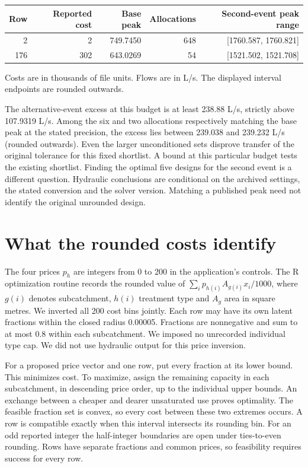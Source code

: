 \documentclass[11pt]{article}
\begin{document}
\begin{center}
\begin{tabular}{rrrrr}\toprule
Row & Reported cost & Base peak & Allocations & Second-event peak range\\\midrule
2 & 2 & 749.7450 & 648 & [1760.587, 1760.821]\\
176 & 302 & 643.0269 & 54 & [1521.502, 1521.708]\\\bottomrule
\end{tabular}\end{center}
Costs are in thousands of file units. Flows are in L/s. The displayed interval endpoints are rounded outwards.

The alternative-event excess at this budget is at least 238.88 L/s, strictly above 107.9319 L/s. Among the six and two allocations respectively matching the base peak at the stated precision, the excess lies between 239.038 and 239.232 L/s (rounded outwards). Even the larger unconditioned sets disprove transfer of the original tolerance for this fixed shortlist. A bound at this particular budget tests the existing shortlist. Finding the optimal five designs for the second event is a different question. Hydraulic conclusions are conditional on the archived settings, the stated conversion and the solver version. Matching a published peak need not identify the original unrounded design.

\newpage\section{What the rounded costs identify}
The four prices \(p_h\) are integers from 0 to 200 in the application's controls. The R optimization routine records the rounded value of \(\sum_i p_{h(i)} A_{g(i)} x_i/1000\), where \(g(i)\) denotes subcatchment, \(h(i)\) treatment type and \(A_g\) area in square metres. We inverted all 200 cost bins jointly. Each row may have its own latent fractions within the closed radius 0.00005. Fractions are nonnegative and sum to at most 0.8 within each subcatchment. We imposed no unrecorded individual type cap. We did not use hydraulic output for this price inversion.

For a proposed price vector and one row, put every fraction at its lower bound. This minimizes cost. To maximize, assign the remaining capacity in each subcatchment, in descending price order, up to the individual upper bounds. An exchange between a cheaper and dearer unsaturated use proves optimality. The feasible fraction set is convex, so every cost between these two extremes occurs. A row is compatible exactly when this interval intersects its rounding bin. For an odd reported integer the half-integer boundaries are open under ties-to-even rounding. Rows have separate fractions and common prices, so feasibility requires success for every row.
\end{document}
